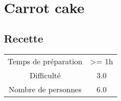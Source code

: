\newpage
\section{Carrot cake}
    \label{sec:Carrot cake}
    \subsection{Recette}
    \vspace{1cm}


    \begin{center}
        \begin{tabular}{c|c}
            Temps de préparation & >= 1h \\
            Difficulté & 3.0 \\
            Nombre de personnes & 6.0 
        \end{tabular}
    \end{center}{}

    \vspace{1cm}
    \hline
    \vspace{1cm}

